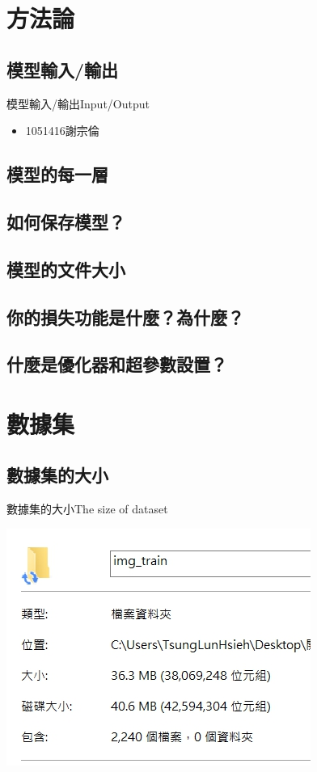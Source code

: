 \documentclass[utf8x]{beamer}
\begin{document}
\section{方法論}

\subsection{模型輸入/輸出}
\begin{frame}{模型輸入/輸出}{Input/Output}
  \begin{itemize}
  \item {
    1051416謝宗倫
  }
  \end{itemize}
\end{frame}
\subsection{模型的每一層}
\subsection{如何保存模型？}
\subsection{模型的文件大小}
\subsection{你的損失功能是什麼？為什麼？}
\subsection{什麼是優化器和超參數設置？}
\section{數據集}
\subsection{數據集的大小}
\begin{frame}{數據集的大小}{The size of  dataset}
\begin{minipage}[c][0.4\textheight][c]{\linewidth}
                \centering
                \includegraphics[width=0.5\linewidth]{1561052804594.jpg}
            \end{minipage}
\end{frame}
\end{document}

